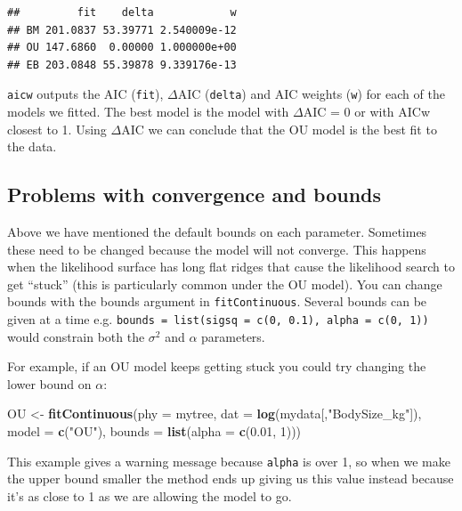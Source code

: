 \documentclass[]{book}
\newenvironment{Shaded}{\begin{snugshade}}{\end{snugshade}}
\newcommand{\KeywordTok}[1]{\textcolor[rgb]{0.13,0.29,0.53}{\textbf{{#1}}}}
\newcommand{\DataTypeTok}[1]{\textcolor[rgb]{0.13,0.29,0.53}{{#1}}}
\newcommand{\DecValTok}[1]{\textcolor[rgb]{0.00,0.00,0.81}{{#1}}}
\newcommand{\FloatTok}[1]{\textcolor[rgb]{0.00,0.00,0.81}{{#1}}}
\newcommand{\StringTok}[1]{\textcolor[rgb]{0.31,0.60,0.02}{{#1}}}
\newcommand{\NormalTok}[1]{{#1}}
\begin{document}
\begin{verbatim}
##         fit    delta            w
## BM 201.0837 53.39771 2.540009e-12
## OU 147.6860  0.00000 1.000000e+00
## EB 203.0848 55.39878 9.339176e-13
\end{verbatim}

\texttt{aicw} outputs the AIC (\texttt{fit}), \(\Delta\)AIC
(\texttt{delta}) and AIC weights (\texttt{w}) for each of the models we
fitted. The best model is the model with \(\Delta\)AIC = 0 or with AICw
closest to 1. Using \(\Delta\)AIC we can conclude that the OU model is
the best fit to the data.

\subsection{Problems with convergence and
bounds}\label{problems-with-convergence-and-bounds}

Above we have mentioned the default bounds on each parameter. Sometimes
these need to be changed because the model will not converge. This
happens when the likelihood surface has long flat ridges that cause the
likelihood search to get ``stuck'' (this is particularly common under
the OU model). You can change bounds with the bounds argument in
\texttt{fitContinuous}. Several bounds can be given at a time e.g.
\texttt{bounds\ =\ list(sigsq\ =\ c(0,\ 0.1),\ alpha\ =\ c(0,\ 1))}
would constrain both the \(\sigma^2\) and \(\alpha\) parameters.

For example, if an OU model keeps getting stuck you could try changing
the lower bound on \(\alpha\):

\begin{Shaded}
\begin{Highlighting}[]
\NormalTok{OU <-}\StringTok{ }\KeywordTok{fitContinuous}\NormalTok{(}\DataTypeTok{phy =} \NormalTok{mytree, }\DataTypeTok{dat =} \KeywordTok{log}\NormalTok{(mydata[,}\StringTok{"BodySize_kg"}\NormalTok{]), }\DataTypeTok{model =} \KeywordTok{c}\NormalTok{(}\StringTok{"OU"}\NormalTok{), }
                    \DataTypeTok{bounds =} \KeywordTok{list}\NormalTok{(}\DataTypeTok{alpha =} \KeywordTok{c}\NormalTok{(}\FloatTok{0.01}\NormalTok{, }\DecValTok{1}\NormalTok{)))}
\end{Highlighting}
\end{Shaded}

This example gives a warning message because \texttt{alpha} is over 1,
so when we make the upper bound smaller the method ends up giving us
this value instead because it's as close to 1 as we are allowing the
model to go.
\end{document}
